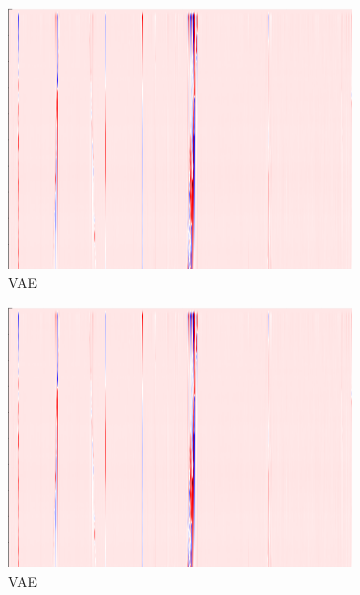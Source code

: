 \begin{figure}[!h]
    \begin{subfigure}{0.33\textwidth}
        \includegraphics[width=\textwidth]{figures/test.png}
        \caption{VAE}
    \end{subfigure}%
    \hfill
    \begin{subfigure}{0.33\textwidth}
        \includegraphics[width=\textwidth]{figures/test.png}
        \caption{VAE}
    \end{subfigure}%
    \hfill
    \begin{subfigure}{0.33\textwidth}

\end{subfigure}
\end{figure}

